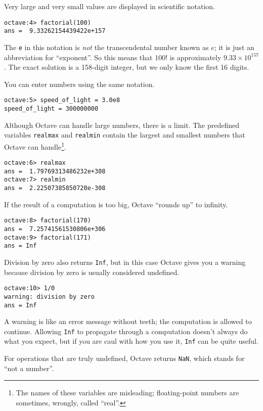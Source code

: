 Very large and very small values are displayed in scientific notation.

\begin{verbatim}
octave:4> factorial(100)
ans =  9.33262154439422e+157
\end{verbatim}

The {\tt e} in this notation is {\em not} the transcendental number
known as $e$; it is just an abbreviation for ``exponent''. So
this means that $100!$ is approximately $9.33 \times 10^{157}$. The
exact solution is a 158-digit integer, but we only know the first 16
digits.

You can enter numbers using the same notation.

\begin{verbatim}
octave:5> speed_of_light = 3.0e8
speed_of_light = 300000000
\end{verbatim}

Although Octave can handle large numbers, there is a limit. The
predefined variables {\tt realmax} and {\tt realmin} contain the
largest and smallest numbers that Octave can handle\footnote{The names
of these variables are misleading; floating-point numbers are
sometimes, wrongly, called ``real''.}.

\begin{verbatim}
octave:6> realmax
ans =  1.79769313486232e+308
octave:7> realmin
ans =  2.22507385850720e-308
\end{verbatim}

If the result of a computation is too big, Octave ``rounds up''
to infinity.

\begin{verbatim}
octave:8> factorial(170)
ans =  7.25741561530806e+306
octave:9> factorial(171)
ans = Inf
\end{verbatim}

Division by zero also returns {\tt Inf}, but in this case Octave
gives you a warning because division by zero is usually
considered undefined.

\begin{verbatim}
octave:10> 1/0
warning: division by zero
ans = Inf
\end{verbatim}

A warning is like an error message without teeth; the computation
is allowed to continue. Allowing {\tt Inf} to propagate
through a computation doesn't always do what you expect, but if you
are caul with how you use it, {\tt Inf} can be quite useful.

For operations that are truly undefined, Octave returns {\tt NaN},
which stands for ``not a number''.

